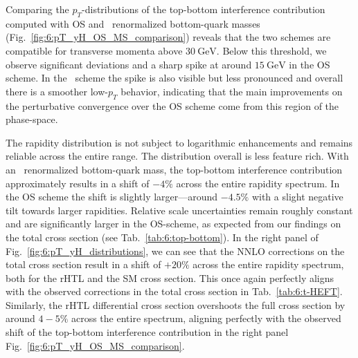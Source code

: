 Comparing the $p_T$-distributions of the top-bottom interference contribution computed with \acs{OS} and \MS\ renormalized bottom-quark masses (Fig.~\ref{fig:6:pT_yH_OS_MS_comparison}) reveals that the two schemes are compatible for transverse momenta above $30\ \mathrm{GeV}$. Below this threshold, we observe significant deviations and a sharp spike at around $15\ \mathrm{GeV}$ in the \acs{OS} scheme. In the \MS\ scheme the spike is also visible but less pronounced and overall there is a smoother low-$p_T$ behavior, indicating that the main improvements on the perturbative convergence over the \acs{OS} scheme come from this region of the phase-space.

The rapidity distribution is not subject to logarithmic enhancements and remains reliable across the entire range. The distribution overall is less feature rich. With an \MS\ renormalized bottom-quark mass, the top-bottom interference contribution approximately results in a shift of $-4\%$ across the entire rapidity spectrum. In the \acs{OS} scheme the shift is slightly larger---around $-4.5\%$ with a slight negative tilt towards larger rapidities. Relative scale uncertainties remain roughly constant and are significantly larger in the \acs{OS}-scheme, as expected from our findings on the total cross section (see Tab.~\ref{tab:6:top-bottom}). In the right panel of Fig.~\ref{fig:6:pT_yH_distributions}, we can see that the \acs{NNLO} corrections on the total cross section result in a shift of $+20\%$ across the entire rapidity spectrum, both for the \acs{rHTL} and the \acs{SM} cross section. This once again perfectly aligns with the observed corrections in the total cross section in Tab.~\ref{tab:6:t-HEFT}. Similarly, the \acs{rHTL} differential cross section overshoots the full cross section by around $4-5\%$ across the entire spectrum, aligning perfectly with the observed shift of the top-bottom interference contribution in the right panel Fig.~\ref{fig:6:pT_yH_OS_MS_comparison}.


